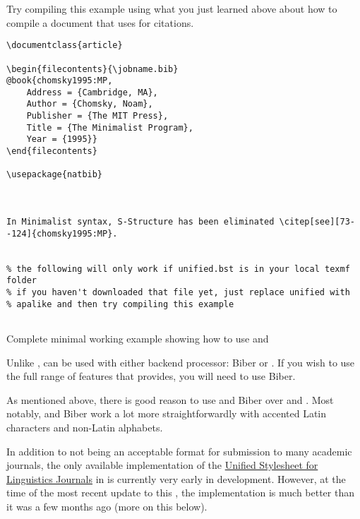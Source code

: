 Try compiling this example using what you just learned above about how to compile a  document that uses  for citations.

\begin{listing}[htbp]
	\centering
	\begin{verbatim}
\documentclass{article}

\begin{filecontents}{\jobname.bib}
@book{chomsky1995:MP,
    Address = {Cambridge, MA},
    Author = {Chomsky, Noam},
    Publisher = {The MIT Press},
    Title = {The Minimalist Program},
    Year = {1995}}
\end{filecontents}

\usepackage{natbib}



In Minimalist syntax, S-Structure has been eliminated \citep[see][73--124]{chomsky1995:MP}.


% the following will only work if unified.bst is in your local texmf folder
% if you haven't downloaded that file yet, just replace unified with
% apalike and then try compiling this example


	\end{verbatim}
	\caption{Complete minimal working example showing how to use  and }
	\label{lst:natbib-example}
\end{listing}

\label{subsubsubsec:biblatex}

Unlike ,  can be used with either backend processor: Biber or .
If you wish to use the full range of features that  provides, you will need to use Biber.

As mentioned above, there is good reason to use  and Biber over  and .
Most notably,  and Biber work a lot more straightforwardly with accented Latin characters and non-Latin alphabets.

In addition to not being an acceptable format for submission to many academic journals, the only available implementation of the \href{http://celxj.org/downloads/UnifiedStyleSheet.pdf}{Unified Stylesheet for Linguistics Journals} in  is currently very early in development.
However, at the time of the most recent update to this , the implementation is much better than it was a few months ago (more on this below).

